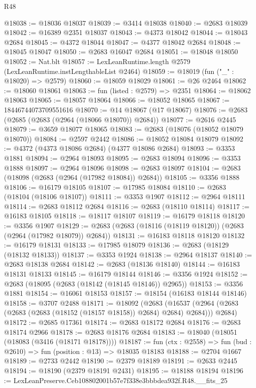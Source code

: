 \begin{lexlean}{R48}
\begin{coremodule}
@18038 := @18036 @18037
@18039 := @3414 @18038
@18040 := @2683 @18039
@18042 := @16389 @2351 @18037
@18043 := @4373 @18042
@18044 := @18043 @2684
@18045 := @4372 @18044
@18047 := @4377 @18042 @2684
@18048 := @18045 @18047
@18050 := @2683 @16047 @2684
@18051 := @18048 @18050
@18052 := Nat.blt
@18057 := LexLeanRuntime.length @2579 (LexLeanRuntime.instLengthableList @2464)
@18059 := @18019 (fun ("_" : @18020) => @2579)
@18060 := @18059 @18029
@18061 := @26 @2464
@18062 := @18060 @18061
@18063 := fun (listed : @2579) => @2351
@18064 := @18062 @18063
@18065 := @18057 @18064
@18066 := @18052 @18065
@18067 := 18446744073709551616
@18070 := @14 @18067 (@17 @18067)
@18076 := @2683 (@2685 (@2683 (@2964 (@18066 @18070)) @2684))
@18077 := @2616 @2445
@18079 := @3659 @18077 @18065
@18083 := @2683 (@18076 (@18052 @18079 @18070))
@18084 := @2597 @2442
@18086 := @18052 @18084 @18079
@18092 := @4372 (@4373 @18086 @2684) (@4377 @18086 @2684)
@18093 := @3353 @1881
@18094 := @2964 @18093
@18095 := @2683 @18094
@18096 := @3353 @1888
@18097 := @2964 @18096
@18098 := @2683 @18097
@18104 := @2683 (@18098 (@2683 (@2964 (@17982 @18084)) @2684))
@18105 := @3356 @1888
@18106 := @16179 @18105
@18107 := @17985 @18084
@18110 := @2683 (@18104 (@18106 @18107))
@18111 := @3353 @1907
@18112 := @2964 @18111
@18114 := @2683 @18112 @2684
@18116 := @2683 (@18110 @18114)
@18117 := @16183 @18105
@18118 := @18117 @18107
@18119 := @16179 @18118
@18120 := @3356 @1907
@18129 := @2683 (@2683 (@18116 (@18119 @18120)) (@2683 (@2964 (@17982 @18079)) @2684))
@18131 := @16183 @18118 @18120
@18132 := @16179 @18131
@18133 := @17985 @18079
@18136 := @2683 (@18129 (@18132 @18133))
@18137 := @3353 @1924
@18138 := @2964 @18137
@18140 := @2683 @18138 @2684
@18142 := @2683 (@18136 @18140)
@18144 := @16183 @18131 @18133
@18145 := @16179 @18144
@18146 := @3356 @1924
@18152 := @2683 (@18095 (@2683 (@18142 (@18145 @18146)) @2965))
@18153 := @3356 @1881
@18154 := @16061 @18153
@18157 := @18154 (@16183 @18144 @18146)
@18158 := @3707 @2488
@18171 := @18092
    (@2683
      (@16537 (@2964 (@2683 (@2683 (@2683 (@18152 (@18157 @18158)) @2684) @2684) @2684)))
      @2684)
@18172 := @2685 @17361
@18174 := @2683 @18172 @2684
@18176 := @2683 @18174 @2966
@18178 := @2683 @18176 @2684
@18183 := @18040 (@18051 (@18083 (@3416 (@18171 @18178))))
@18187 := fun (ctx : @2558) => fun (bud : @2610) => fun (position : @13) => @18035 @18183
@18188 := @2704 @1667
@18189 := @2733 @2442
@18190 := @2379 @18189
@18191 := @2633 @2445
@18194 := @18190 (@2379 @18191 @2431)
@18195 := @18188 @18194
@18196 := LexLeanPreserve.Ceb108802001b57e7f338e3bbbdea932f.R48.__fits_25

\end{coremodule}
\end{lexlean}
